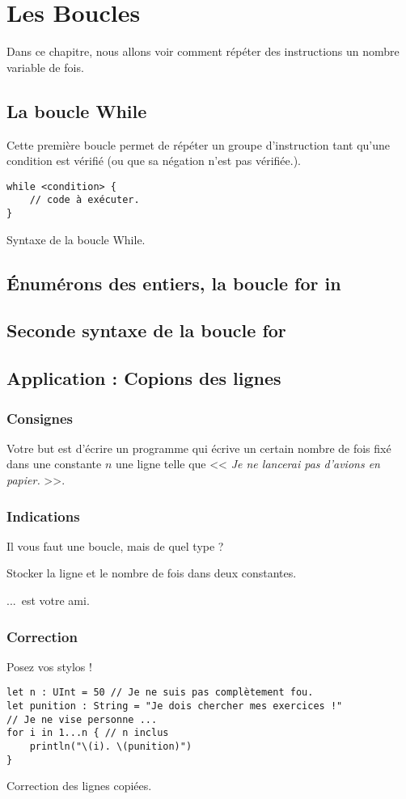 \chapter{Les Boucles}
Dans ce chapitre, nous allons voir comment
répéter des instructions un nombre variable de fois.
\section{La boucle While}
Cette première boucle permet de répéter un groupe d'instruction tant qu'une condition est vérifié (ou que sa négation n'est pas vérifiée.).

\begin{listing}[h]
\begin{verbatim}
while <condition> {
    // code à exécuter.
}
\end{verbatim}
\caption{Syntaxe de la boucle While.}
\end{listing}
\section{Énumérons des entiers, la boucle for in}
\section{Seconde syntaxe de la boucle for}
\section{Application : Copions des lignes}
\subsection{Consignes}
Votre but est d'écrire un programme qui
écrive un certain nombre de fois fixé dans une constante $n$ une ligne telle que << \emph{Je ne lancerai pas d'avions en papier.} >>.
\pagebreak %
\subsection{Indications}
Il vous faut une boucle, mais de quel type ?

Stocker la ligne et le nombre de fois dans deux constantes.

...\ est votre ami.
\pagebreak %
\subsection{Correction}
Posez vos stylos !
\begin{listing}[h]
\begin{verbatim}
let n : UInt = 50 // Je ne suis pas complètement fou.
let punition : String = "Je dois chercher mes exercices !"
// Je ne vise personne ...
for i in 1...n { // n inclus
    println("\(i). \(punition)")
}
\end{verbatim}
\caption{Correction des lignes copiées.}
\end{listing}%

